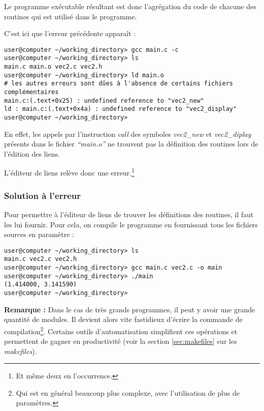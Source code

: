 \documentclass[../../../main.tex]{subfiles}
\begin{document}
\begin{minipage}{\textwidth}
	\begin{center}
		
	\end{center}
\end{minipage}

Le programme exécutable résultant est donc l'agrégation du code de chacune des routines qui est utilisé dans le programme.
 
C'est ici que l'erreur précédente apparaît :
\begin{verbatim}
user@computer ~/working_directory> gcc main.c -c
user@computer ~/working_directory> ls
main.c main.o vec2.c vec2.h
user@computer ~/working_directory> ld main.o
# les autres erreurs sont dûes à l'absence de certains fichiers complémentaires
main.c:(.text+0x25) : undefined reference to "vec2_new"
ld : main.c:(.text+0x4a) : undefined reference to "vec2_display"
user@computer ~/working_directory> 
\end{verbatim}
En effet, les appels par l'instruction \textit{call} des symboles \textit{vec2\_new} et \textit{vec2\_diplay} présents dans le fichier \textit{``main.o''} ne trouvent pas la définition des routines lors de l'édition des liens.

L'éditeur de liens relève donc une erreur.\footnote{Et même deux en l'occurrence.}
\subsubsection{Solution à l'erreur}
\label{ssub:solution_l_erreur}
Pour permettre à l'éditeur de liens de trouver les définitions des routines, il faut les lui fournir. Pour cela, on compile le programme en fournissant tous les fichiers sources en paramètre :
\begin{verbatim}
user@computer ~/working_directory> ls
main.c vec2.c vec2.h
user@computer ~/working_directory> gcc main.c vec2.c -o main
user@computer ~/working_directory> ./main
(1.414000, 3.141590)
user@computer ~/working_directory>
\end{verbatim}
\textbf{Remarque :} Dans le cas de très grands programmes, il peut y avoir une grande quantité de modules. Il devient alors vite fastidieux d'écrire la commande de compilation\footnote{Qui est en général beaucoup plus complexe, avec l'utilisation de plus de paramètres.}. Certains outils d'automatisation simplifient ces opérations et permettent de gagner en productivité (voir la section \ref{sec:makefiles} sur les \textit{makefiles}).
 
\end{document}
